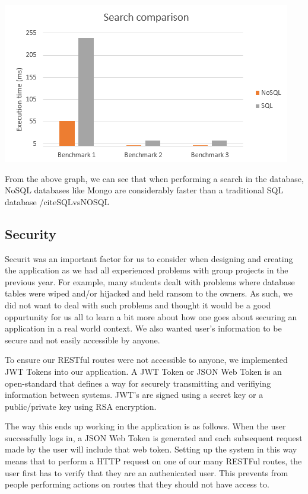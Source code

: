     \begin{center}    
      \includegraphics{img/SQLvsNOSQL.png}
    \end{center}

    From the above graph, we can see that when performing a search in the database, NoSQL databases like Mongo are considerably faster than a traditional SQL database /cite{SQLvsNOSQL}

    \subsection{Security}
    Securit was an important factor for us to consider when designing and creating the application as we had all experienced problems with group projects in the previous year. For example, many students dealt with problems where database tables were wiped and/or hijacked and held ransom
    to the owners. As such, we did not want to deal with such problems and thought it would be a good oppurtunity for us all to learn a bit more about how one goes about securing an application in a real world context. We also wanted user's information to be secure and not easily accessible by anyone.
    
    To ensure our RESTful routes were not accessible to anyone, we implemented JWT Tokens into our application. A JWT Token or JSON Web Token is an open-standard that defines a way for securely transmitting and verifiying information between systems.
    JWT's are signed using a secret key or a public/private key using RSA encryption.
    
    The way this ends up working in the application is as follows. When the user successfully logs in, a JSON Web Token is generated and each subsequent request
    made by the user will include that web token. Setting up the system in this way means that to perform a HTTP request on one of our many RESTFul routes, the user first has to 
    verify that they are an authenicated user. This prevents from people performing actions on routes that they should not have access to. 

